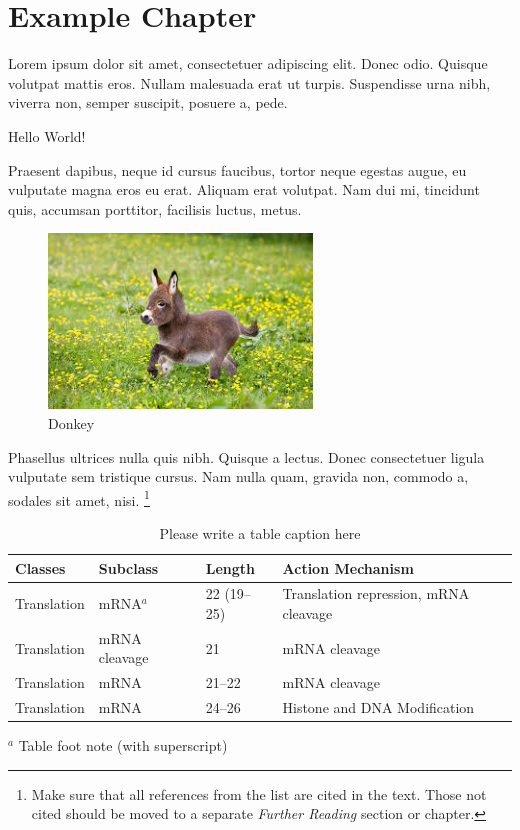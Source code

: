 \section{Example Chapter}

Lorem ipsum dolor sit amet, consectetuer adipiscing elit. Donec odio. Quisque volutpat mattis eros. Nullam malesuada erat ut turpis. Suspendisse urna nibh, viverra non, semper suscipit, posuere a, pede.

\begin{graybox}
  Hello World!~\parencite{einstein}
\end{graybox}

Praesent dapibus, neque id cursus faucibus, tortor neque egestas augue, eu vulputate magna eros eu erat. Aliquam erat volutpat. Nam dui mi, tincidunt quis, accumsan porttitor, facilisis luctus, metus.

\begin{figure}
  \includegraphics[width=7cm]{inc/donkey.jpg}
  \caption{Donkey}
\end{figure}

Phasellus ultrices nulla quis nibh. Quisque a lectus. Donec consectetuer ligula vulputate sem tristique cursus. Nam nulla quam, gravida non, commodo a, sodales sit amet, nisi. \footnote{Make sure that all references from the list are cited in the text. Those not cited should be moved to a separate \textit{Further Reading} section or chapter.}

\begin{table}[!htp]
  \caption{Please write a table caption here}
  \label{tab:1}
  \begin{tabular*}{14.0cm}{p{2.0cm}p{2.5cm}p{2.0cm}p{7.5cm}}
    \toprule
    Classes & Subclass & Length & Action Mechanism  \\
    \midrule
    Translation & mRNA$^a$  & 22 (19--25) & Translation repression, mRNA cleavage\\
    Translation & mRNA cleavage & 21 & mRNA cleavage\\
    Translation & mRNA  & 21--22 & mRNA cleavage\\
    Translation & mRNA  & 24--26 & Histone and DNA Modification\\
    \bottomrule
  \end{tabular*}
  $^a$ Table foot note (with superscript)
\end{table}


